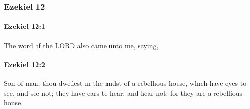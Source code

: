 	\subsubsection{Ezekiel 12} %
		\label{EZEKIEL-12}

		\paragraph{Ezekiel 12:1} %
			\label{EZEKIEL-12-1}

			The word of the LORD also came unto me, saying,


		\paragraph{Ezekiel 12:2} %
			\label{EZEKIEL-12-2}

			Son of man, thou dwellest in the midst of a rebellious house, which have eyes to see, and see not; they have ears to hear, and hear not: for they are a rebellious house.

